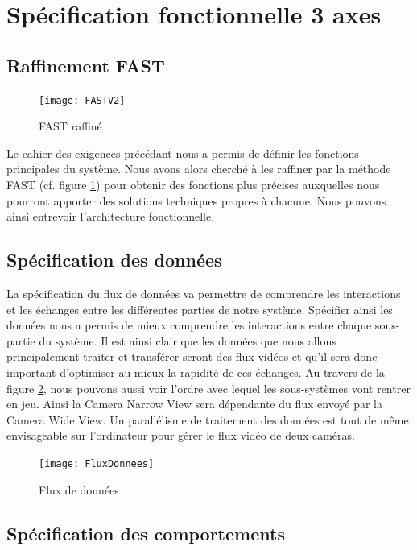 \section{Spécification fonctionnelle  3 axes}

\subsection{Raffinement FAST}

\begin{figure}[H]
  \centering
  \texttt{[image: FASTV2]}
  \caption{FAST raffiné}
  \label{fig:FAST}
\end{figure}

Le cahier des exigences précédant nous a permis de définir les fonctions principales du système. Nous avons alors cherché à les raffiner par la méthode FAST (cf. figure \ref{fig:FAST}) pour obtenir des fonctions plus précises auxquelles nous pourront apporter des solutions techniques propres à chacune. Nous pouvons ainsi entrevoir l'architecture fonctionnelle.

\subsection{Spécification des données}

La spécification du flux de données va permettre de comprendre les interactions et les échanges entre les différentes parties de notre système. Spécifier ainsi les données nous a permis de mieux comprendre les interactions entre chaque sous-partie du système. Il est ainsi clair que les données que nous allons principalement traiter et transférer seront des flux vidéos et qu’il sera donc important d’optimiser au mieux la rapidité de ces échanges.
Au travers de la figure \ref{fig:fluxDonnees}, nous pouvons aussi voir l’ordre avec lequel les sous-systèmes vont rentrer en jeu. Ainsi la Camera Narrow View sera dépendante du flux envoyé par la Camera Wide View. Un parallélisme de traitement des données est tout de même envisageable sur l'ordinateur pour gérer le flux vidéo de deux caméras.

\begin{figure}[h]
  \centering
  \texttt{[image: FluxDonnees]}
  \caption{Flux de données}
  \label{fig:fluxDonnees}
\end{figure}

\subsection{Spécification des comportements}

